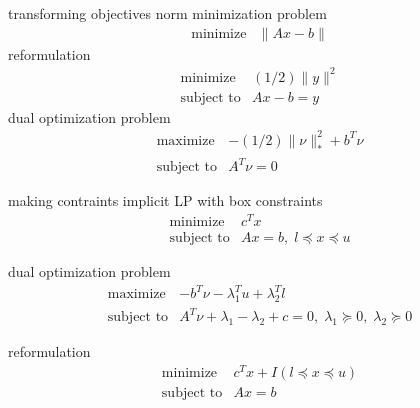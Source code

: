 \documentclass[17pt,landscape]{foils}
\begin{document}
{

\bit
\item
	transforming objectives
	\bit
	\vitem
		norm minimization problem
		$$
			\begin{array}{ll}
				\mbox{minimize} &
					\|Ax - b\|
			\end{array}
		$$
	\vitem
		reformulation
		$$
			\begin{array}{ll}
				\mbox{minimize} &
					(1/2)\|y\|^2
				\\
				\mbox{subject to} &
					Ax - b = y
			\end{array}
		$$
	\vitem
		dual optimization problem
		$$
			\begin{array}{ll}
				\mbox{maximize} &
					-(1/2)\|\nu\|_\ast^2 + b^T\nu
				\\
				\mbox{subject to} &
					A^T\nu = 0
			\end{array}
		$$
	\eit
\eit
\vfill



\bit
\item
	making contraints implicit
	\bit
	\vitem
		LP with box constraints
		$$
			\begin{array}{ll}
				\mbox{minimize} &
					c^T x
				\\
				\mbox{subject to} &
					Ax = b,\;
					l \preceq x \preceq u
			\end{array}
		$$

	\vitem
		dual optimization problem
		$$
			\begin{array}{ll}
				\mbox{maximize} &
					-b^T\nu - \lambda_1^Tu + \lambda_2^Tl
				\\
				\mbox{subject to} &
					A^T\nu + \lambda_1 - \lambda_2 + c = 0,\;
					\lambda_1 \succeq 0,\; \lambda_2 \succeq 0
			\end{array}
		$$

	\vitem
		reformulation
		$$
			\begin{array}{ll}
				\mbox{minimize} &
						c^T x
						+ I ( l\preceq x \preceq u)
				\\
				\mbox{subject to} &
					Ax = b
			\end{array}
		$$

}
\end{document}
